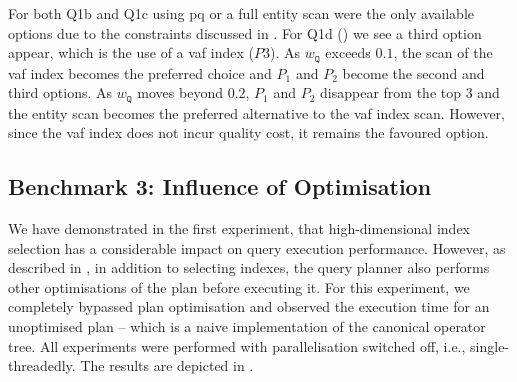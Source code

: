 For both Q1b and Q1c using \acrshort{pq} or a full entity scan were the only available options due to the constraints discussed in . For Q1d () we see a third option appear, which is the use of a \acrshort{vaf} index ($P3$). As $w_{\mathtt{Q}}$ exceeds $0.1$, the scan of the \acrshort{vaf} index becomes the preferred choice and $P_1$ and $P_2$ become the second and third options. As $w_{\mathtt{Q}}$ moves beyond $0.2$, $P_1$ and $P_2$ disappear from the top 3 and the entity scan becomes the preferred alternative to the \acrshort{vaf} index scan. However, since the \acrshort{vaf} index does not incur quality cost, it remains the favoured option.

\newpage

\subsection{Benchmark 3: Influence of Optimisation}
We have demonstrated in the first experiment, that high-dimensional index selection has a considerable impact on query execution performance. However, as described in , in addition to selecting indexes, the query planner also performs other optimisations of the plan before executing it. For this experiment, we completely bypassed plan optimisation and observed the execution time for an unoptimised plan -- which is a naive implementation of the canonical operator tree. All experiments were performed with parallelisation switched off, i.e., single-threadedly. The results are depicted in .


